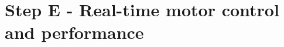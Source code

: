 \documentclass[../main.tex]{subfiles}
\begin{document}



\section{Step E - Real-time motor control and performance}
\end{document}
